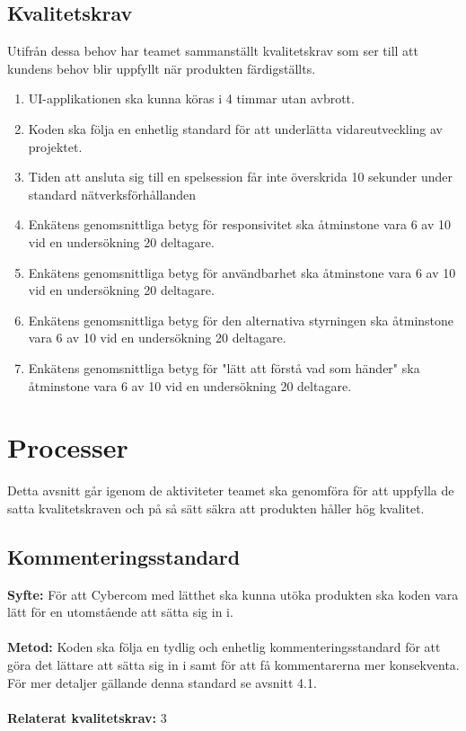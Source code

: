 \documentclass[10pt]{article}
\begin{document}
	\subsection{Kvalitetskrav}
	Utifrån dessa behov har teamet sammanställt kvalitetskrav som ser till att kundens behov blir uppfyllt när produkten färdigställts.
	\begin{enumerate}
		\item UI-applikationen ska kunna köras i 4 timmar utan avbrott.
		\item Koden ska följa en enhetlig standard för att underlätta vidareutveckling av projektet.
		\item Tiden att ansluta sig till en spelsession får inte överskrida 10 sekunder under standard nätverksförhållanden
		\item Enkätens genomsnittliga betyg för responsivitet ska åtminstone vara 6 av 10 vid en undersökning 20 deltagare.
		\item Enkätens genomsnittliga betyg för användbarhet ska åtminstone vara 6 av 10 vid en undersökning 20 deltagare.
		\item Enkätens genomsnittliga betyg för den alternativa styrningen ska åtminstone vara 6 av 10 vid en undersökning 20 deltagare.
		\item Enkätens genomsnittliga betyg för "lätt att förstå vad som händer" ska åtminstone vara 6 av 10 vid en undersökning 20 deltagare.
		
	\end{enumerate}

\pagebreak
\section{Processer}
	Detta avsnitt går igenom de aktiviteter teamet ska genomföra för att uppfylla de satta kvalitetskraven och på så sätt säkra att produkten håller hög kvalitet.
	\subsection{Kommenteringsstandard}
	\textbf{Syfte:} För att Cybercom med lätthet ska kunna utöka produkten ska koden vara lätt för en utomstående att sätta sig in i.
	\\\\
	\textbf{Metod:} Koden ska följa en tydlig och enhetlig kommenteringsstandard för att göra det lättare att sätta sig in i samt för att få kommentarerna mer konsekventa. För mer detaljer gällande denna standard se avsnitt 4.1.
	\\\\
	\textbf{Relaterat kvalitetskrav:} 3
	\\
	
\end{document}
